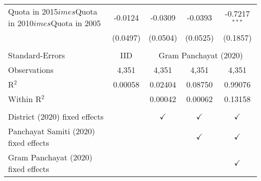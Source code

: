 \begin{tabular}{lcccc}
   Quota in 2015$	imes$Quota in 2010$	imes$Quota in 2005 & -0.0124        & -0.0309       & -0.0393       & -0.7217$^{***}$\\   
                                                           & (0.0497)       & (0.0504)      & (0.0525)      & (0.1857)\\   
    \\
   Standard-Errors & IID & \multicolumn{3}{c}{Gram Panchayat (2020)} \\ 
   Observations                                            & 4,351          & 4,351         & 4,351         & 4,351\\  
   R$^2$                                                   & 0.00058        & 0.02404       & 0.08750       & 0.99076\\  
   Within R$^2$                                            &                & 0.00042       & 0.00062       & 0.13158\\  
    \\
   District (2020) fixed effects                           &                & $\checkmark$  & $\checkmark$  & $\checkmark$\\   
   Panchayat Samiti (2020) fixed effects                   &                &               & $\checkmark$  & $\checkmark$\\   
   Gram Panchayat (2020) fixed effects                     &                &               &               & $\checkmark$\\   
   \bottomrule
\end{tabular}
\par\endgroup


